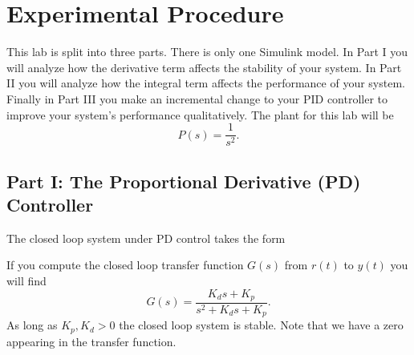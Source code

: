 \section{Experimental Procedure}\label{Lab:4:Experiment}
This lab is split into three parts.
There is only one Simulink model.
In Part I you will analyze how the derivative term affects the stability of your system.
In Part II you will analyze how the integral term affects the performance of your system.
Finally in Part III you make an incremental change to your PID controller to improve your system's performance qualitatively.
The plant for this lab will be
\[
  P(s) = \frac{1}{s^2}.
\]

\subsection{Part I: The Proportional Derivative (PD) Controller}
The closed loop system under PD control takes the form
%
\begin{center}
\end{center}
If you compute the closed loop transfer function \(G(s)\) from \(r(t)\) to \(y(t)\) you will find
\[
  G(s) = \frac{K_d s + K_p}{s^2 + K_d s + K_p}.
\]
As long as \(K_p, K_d > 0\) the closed loop system is stable.
Note that we have a zero appearing in the transfer function.
